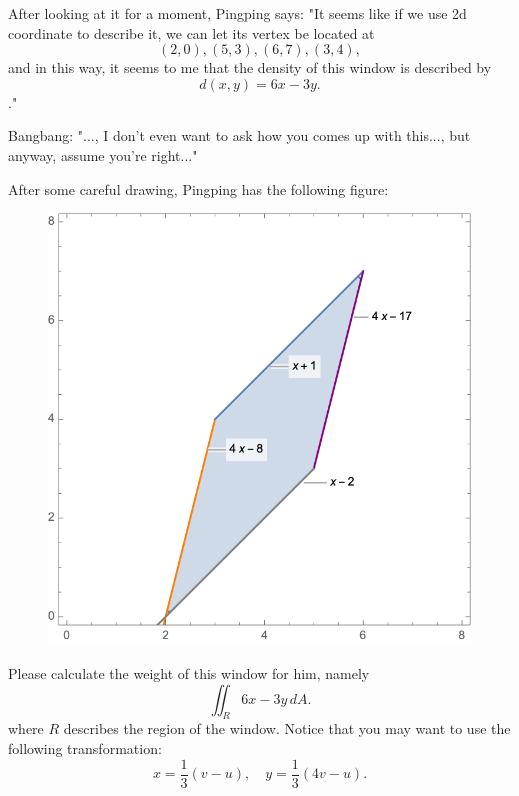 \documentclass[12pt]{article}
\begin{document}
\par After looking at it for a moment, Pingping says: "It seems like if we use 2d coordinate to describe it, we can 
let its vertex be located at
\begin{equation*}
    (2,0), (5,3), (6,7), (3,4), 
\end{equation*}
and in this way, it seems to me that the density of this window is described by 
\begin{equation*}
    d(x,y) = 6x-3y.
\end{equation*}
." 
\par Bangbang: "..., I don't even want to ask how you comes up with this..., but anyway, assume you're right..."

\par After some careful drawing, Pingping has the following figure:
\begin{figure}[H]
    \centering
    \includegraphics[width = 0.7\linewidth]{Figure/2.1.png}
\end{figure}

\par Please calculate the weight of this window for him, namely 
\begin{equation*}
    \iint_R 6x-3y \,dA.
\end{equation*}
where $R$ describes the region of the window. Notice that you may want to use the following transformation:
\begin{equation*}
    x = \frac{1}{3}(v - u), \quad y = \frac{1}{3}(4v - u).
\end{equation*}

\end{document}
